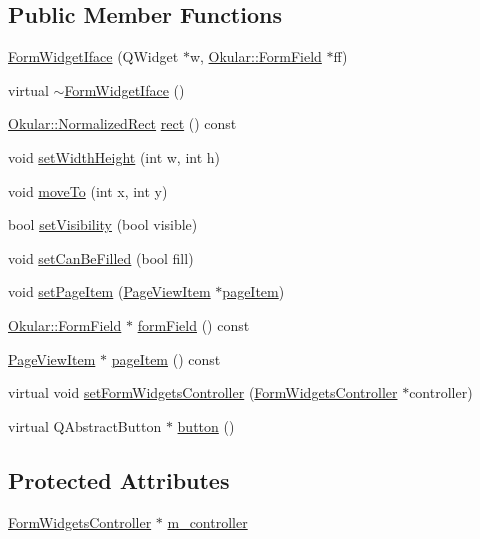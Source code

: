 \subsection*{Public Member Functions}
\begin{DoxyCompactItemize}
\item 
\hyperlink{classFormWidgetIface_a1737728a2348ae69415008ddb1aa3b9d}{Form\+Widget\+Iface} (Q\+Widget $\ast$w, \hyperlink{classOkular_1_1FormField}{Okular\+::\+Form\+Field} $\ast$ff)
\item 
virtual \hyperlink{classFormWidgetIface_ab8762757e9a4bd66bb78dcbef65b4dd2}{$\sim$\+Form\+Widget\+Iface} ()
\item 
\hyperlink{classOkular_1_1NormalizedRect}{Okular\+::\+Normalized\+Rect} \hyperlink{classFormWidgetIface_aa2355e857516e8ca9135ef27e0f3c7aa}{rect} () const 
\item 
void \hyperlink{classFormWidgetIface_a517cae0d6ae89b18427f986e5e3e6ebb}{set\+Width\+Height} (int w, int h)
\item 
void \hyperlink{classFormWidgetIface_a5bd1ef877812bc6b0bb1f93bb93d3ff2}{move\+To} (int x, int y)
\item 
bool \hyperlink{classFormWidgetIface_a1681c05ca9122ad0c44174856a2e2cb6}{set\+Visibility} (bool visible)
\item 
void \hyperlink{classFormWidgetIface_a0cef84677236da4810610c781e38b7f8}{set\+Can\+Be\+Filled} (bool fill)
\item 
void \hyperlink{classFormWidgetIface_a67a28f4a30704dc435419eb9ea56a7de}{set\+Page\+Item} (\hyperlink{classPageViewItem}{Page\+View\+Item} $\ast$\hyperlink{classFormWidgetIface_ada845c8db4d3769a08bb979bc2d37748}{page\+Item})
\item 
\hyperlink{classOkular_1_1FormField}{Okular\+::\+Form\+Field} $\ast$ \hyperlink{classFormWidgetIface_adf39c46a4a3e79e30d48359b61e4bbed}{form\+Field} () const 
\item 
\hyperlink{classPageViewItem}{Page\+View\+Item} $\ast$ \hyperlink{classFormWidgetIface_ada845c8db4d3769a08bb979bc2d37748}{page\+Item} () const 
\item 
virtual void \hyperlink{classFormWidgetIface_a4d3129afff43729fafc4e6b58a4d16fe}{set\+Form\+Widgets\+Controller} (\hyperlink{classFormWidgetsController}{Form\+Widgets\+Controller} $\ast$controller)
\item 
virtual Q\+Abstract\+Button $\ast$ \hyperlink{classFormWidgetIface_afd9eb69f17a3b1d5e970f3cc496ddb17}{button} ()
\end{DoxyCompactItemize}
\subsection*{Protected Attributes}
\begin{DoxyCompactItemize}
\item 
\hyperlink{classFormWidgetsController}{Form\+Widgets\+Controller} $\ast$ \hyperlink{classFormWidgetIface_a2d51d0c5aaf48aad5480551f69f82e9a}{m\+\_\+controller}
\end{DoxyCompactItemize}


